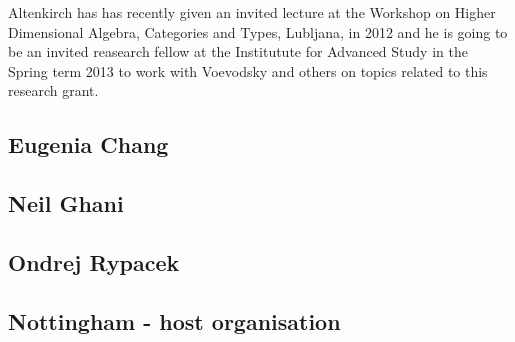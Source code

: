 \documentclass[twocolumn,a4paper]{article}
\renewcommand{\cite}[1]{{\tt[#1]}}
\begin{document}
Altenkirch has has recently given an invited lecture at the Workshop on
Higher Dimensional Algebra, Categories and Types, Lubljana, in 2012
and he is going to be an invited reasearch fellow at the
Institutute for Advanced Study in the Spring term 2013 to work with
Voevodsky and others on topics related to this research grant.
 



\subsection*{Eugenia Chang}

\subsection*{Neil Ghani}

\subsection*{Ondrej Rypacek}

\subsection*{Nottingham - host organisation}
\end{document}
